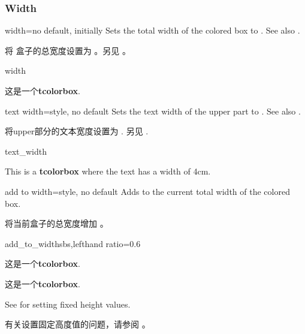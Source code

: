 \subsubsection{Width} 

\begin{docTcbKey}{width}{=}{no default, initially }
Sets the total width of the colored box to .
See also .

将%
盒子的总宽度设置为 。另见 。
\begin{exdispExample}{width} 

\begin{tcolorbox}[width=\linewidth/2]
这是一个\textbf{tcolorbox}.
\end{tcolorbox}
\end{exdispExample}
\end{docTcbKey}


\begin{docTcbKey}[][doc new=2014-10-31]{text width}{=}{style, no default}
Sets the text width of the upper part to .
See also .

将upper部分的文本宽度设置为 .
另见 .
\begin{exdispExample}{text_width}

\begin{tcolorbox}[text width=4cm]
This is a \textbf{tcolorbox} where the text has a width of 4cm.
\end{tcolorbox}
\end{exdispExample}
\end{docTcbKey}

\begin{docTcbKey}[][doc new=2014-11-07]{add to width}{=}{style, no default}
Adds  to the current total width of the colored box.

将当前盒子的总宽度增加  。    
\begin{exdispExample*}{add_to_width}{sbs,lefthand ratio=0.6}

\begin{tcolorbox}
这是一个\textbf{tcolorbox}.
\end{tcolorbox}

\begin{tcolorbox}[add to width=1cm]
这是一个\textbf{tcolorbox}.
\end{tcolorbox}
\end{exdispExample*}
\end{docTcbKey}
See  for setting fixed height values.

有关设置固定高度值的问题，请参阅 。